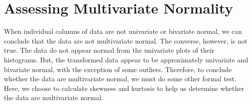 
\section{Assessing Multivariate Normality}
  When individual columns of data are not univariate or bivariate normal, we can
  conclude that the data are not multivariate normal. The converse, however, is
  not true. The data do not appear normal from the univariate plots of their
  histograms. But, the transformed data appear to be approximately univariate
  and bivariate normal, with the exception of some outliers. Therefore, to
  conclude whether the data are multivariate normal, we must do some other
  formal test. Here, we choose to calculate skewness and kurtosis to help us
  determine whether the data are multivariate normal.

